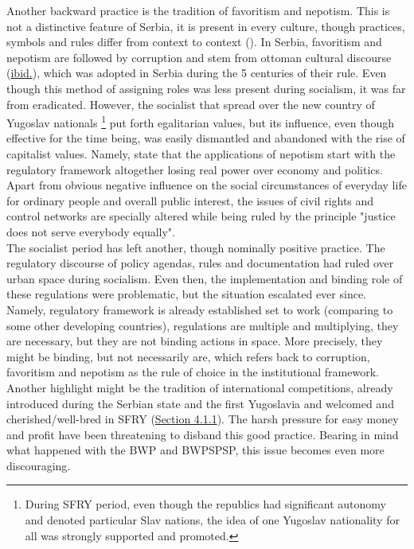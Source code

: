 \documentclass[11pt]{report}
\begin{document}
{Another backward practice is the tradition of favoritism and nepotism.
This is not a distinctive feature of Serbia, it is present in every culture, though practices, symbols and rules differ from context to context (\href{Çarikçi}{\cite{carikci_favoritism_2009}}).
In Serbia, favoritism and nepotism are followed by corruption and stem from ottoman cultural discourse (\href{Çarikçi}{ibid.}), which was adopted in Serbia during the 5 centuries of their rule.
Even though this method of assigning roles was less present during socialism, it was far from eradicated.
However, the socialist that spread over the new country of Yugoslav nationals
\footnote{During SFRY period, even though the republics had significant autonomy and denoted particular Slav nations, the idea of one Yugoslav nationality for all was strongly supported and promoted.}
put forth egalitarian values, but its influence, even though effective for the time being, was  easily dismantled and abandoned with the rise of capitalist values.
Namely, \href{Çarikçi}{\cite{carikci_favoritism_2009}} %
state that the applications of nepotism start with the regulatory framework altogether losing real power over economy and politics.
Apart from obvious negative influence on the social circumstances of everyday life for ordinary people and overall public interest, the issues of civil rights and control networks are specially altered while being ruled by the principle "justice does not serve everybody equally".
\\

The socialist period has left another, though nominally positive practice.
The regulatory discourse of policy agendas, rules and documentation had ruled over urban space during socialism.
Even then, the implementation and binding role of these regulations were problematic, but the situation escalated ever since.
Namely, regulatory framework is already established set to work (comparing to some other developing countries), regulations are multiple and multiplying, they are necessary, but they are not binding actions in space. 
More precisely, they might be binding, but not necessarily are, which  refers back to corruption, favoritism and nepotism as the rule of choice in the institutional framework.
\\

Another highlight might be the tradition of international competitions, already introduced during the Serbian state and the first Yugoslavia and welcomed and cherished/well-bred in SFRY (\href{Section 4.1.1}{Section 4.1.1}).
The harsh pressure for easy money and profit have been threatening  to disband this good practice. Bearing in mind what happened with the BWP and BWPSPSP, this issue becomes even more discouraging.
\\

}
\end{document}
